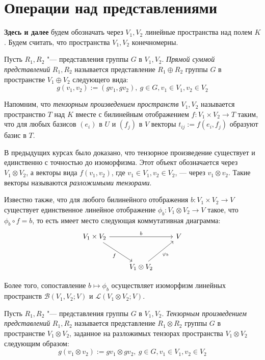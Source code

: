 \section{Операции над представлениями}

\textbf{Здесь и далее} будем обозначать через $V_1, V_2$ линейные пространства над полем $K$. Будем считать, что пространства $V_1, V_2$ конечномерны.

\begin{definition}
	Пусть $R_1, R_2$ "--- представления группы $G$ в $V_1, V_2$. \textit{Прямой суммой представлений} $R_1, R_2$ называется представление $R_1 \oplus R_2$ группы $G$ в пространстве $V_1 \oplus V_2$ следующего вида:
	\[g(v_1, v_2) := (gv_1, gv_2),~g \in G, v_1 \in V_1, v_2 \in V_2\]
\end{definition}

\begin{note}
	Напомним, что \textit{тензорным произведением пространств $V_1, V_2$} называется пространство $T$ над $K$ вместе с билинейным отображением $f: V_1 \times V_2 \to T$ таким, что для любых базисов $(e_i)$ в $U$ и $(f_j)$ в $V$ векторы $t_{ij} := f({e_i}, {f_j})$ образуют базис в $T$.
	
	В предыдущих курсах было доказано, что тензорное произведение существует и единственно с точностью до изоморфизма. Этот объект обозначается через $V_1 \otimes V_2$, а векторы вида $f(v_1, v_2)$, где $v_1 \in V_1, v_2 \in V_2$, --- через $v_1 \otimes v_2$. Такие векторы называются \textit{разложимыми тензорами}.
	
	Известно также, что для любого билинейного отображения $b: V_1 \times V_2 \rightarrow V$ существует единственное линейное отображение $\phi_b: V_1 \otimes V_2 \rightarrow V$ такое, что $\phi_b \circ f = b$, то есть имеет место следующая коммутативная диаграмма:
	\[
	\begin{tikzcd}[row sep = large]
		V_1 \arrow[swap]{dr}{f} \times V_2 \arrow[]{rr}{b} && V\\
		& V_1 \otimes V_2 \arrow[swap]{ur}{\phi_b}&
	\end{tikzcd}
	\]
	
	Более того, сопоставление $b \mapsto \phi_b$ осуществляет изоморфизм линейных пространств $\mathcal{B}(V_1, V_2; V)$ и $\mathcal{L}(V_1 \otimes V_2; V)$.
\end{note}

\begin{definition}
	Пусть $R_1, R_2$ "--- представления группы $G$ в $V_1, V_2$. \textit{Тензорным произведением представлений} $R_1, R_2$ называется представление $R_1 \otimes R_2$ группы $G$ в пространстве $V_1 \otimes V_2$, заданное на разложимых тензорах пространства $V_1 \otimes V_2$ следующим образом:
	\[g(v_1 \otimes v_2) := gv_1 \otimes gv_2,~g \in G, v_1 \in V_1, v_2 \in V_2\]
\end{definition}

